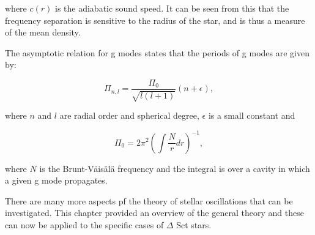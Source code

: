 \noindent where $c(r)$ is the adiabatic sound speed. It can be seen from this that the frequency separation is sensitive to the radius of the star, and is thus a measure of the mean density. 

The asymptotic relation for g modes states that the periods of g modes are given by: 

\begin{equation}
    \Pi_{n,l} = \frac{\Pi_0}{\sqrt{l(l+1)}}(n+\epsilon),
\end{equation}

\noindent where $n$ and $l$ are radial order and spherical degree, $\epsilon$ is a small constant and 

\begin{equation}
    \Pi_{0} = 2\pi^2\left(\int \frac{N}{r} dr\right)^{-1},
\end{equation}

\noindent where $N$ is the Brunt-Väisälä frequency and the integral is over a cavity in which a given g mode propagates.

There are many more aspects pf the theory of stellar oscillations that can be investigated. This chapter provided an overview of the general theory and these can now be applied to the specific cases of $\Delta$ Sct stars. 

